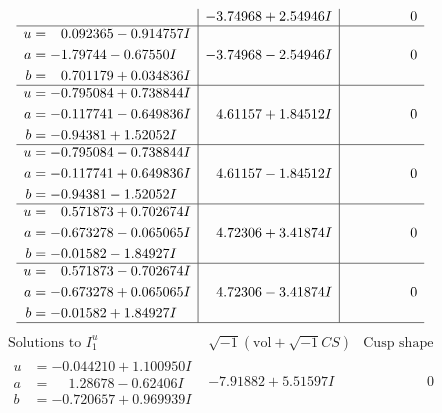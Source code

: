 \documentclass[1p]{elsarticle_modified}
\theoremstyle{definition}
\newcommand{\I}{\sqrt{-1}}
\begin{document}
$$\begin{array}{c|c|c}
 & -3.74968 + 2.54946 I & \phantom{-0.000000 } 0 \\ \hline\begin{aligned}
u &= \phantom{-}0.092365 - 0.914757 I \\
a &= -1.79744 - 0.67550 I \\
b &= \phantom{-}0.701179 + 0.034836 I\end{aligned}
 & -3.74968 - 2.54946 I & \phantom{-0.000000 } 0 \\ \hline\begin{aligned}
u &= -0.795084 + 0.738844 I \\
a &= -0.117741 - 0.649836 I \\
b &= -0.94381 + 1.52052 I\end{aligned}
 & \phantom{-}4.61157 + 1.84512 I & \phantom{-0.000000 } 0 \\ \hline\begin{aligned}
u &= -0.795084 - 0.738844 I \\
a &= -0.117741 + 0.649836 I \\
b &= -0.94381 - 1.52052 I\end{aligned}
 & \phantom{-}4.61157 - 1.84512 I & \phantom{-0.000000 } 0 \\ \hline\begin{aligned}
u &= \phantom{-}0.571873 + 0.702674 I \\
a &= -0.673278 - 0.065065 I \\
b &= -0.01582 - 1.84927 I\end{aligned}
 & \phantom{-}4.72306 + 3.41874 I & \phantom{-0.000000 } 0 \\ \hline\begin{aligned}
u &= \phantom{-}0.571873 - 0.702674 I \\
a &= -0.673278 + 0.065065 I \\
b &= -0.01582 + 1.84927 I\end{aligned}
 & \phantom{-}4.72306 - 3.41874 I & \phantom{-0.000000 } 0\\
 \hline 
 \end{array}$$\newpage$$\begin{array}{c|c|c}  
\text{Solutions to }I^u_{1}& \I (\text{vol} + \sqrt{-1}CS) & \text{Cusp shape}\\
 \hline 
\begin{aligned}
u &= -0.044210 + 1.100950 I \\
a &= \phantom{-}1.28678 - 0.62406 I \\
b &= -0.720657 + 0.969939 I\end{aligned}
 & -7.91882 + 5.51597 I & \phantom{-0.000000 } 0 \\ \hline\begin{aligned}

\end{aligned}
\end{array}$$
\end{document}
